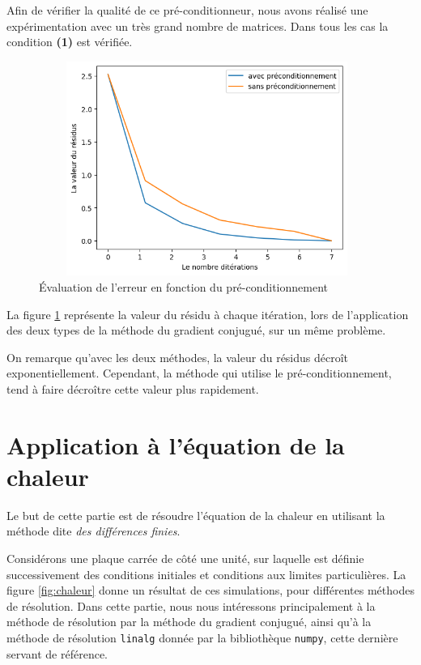 \documentclass[a4paper]{article}
\begin{document}
Afin de vérifier la qualité de ce pré-conditionneur, nous avons réalisé une expérimentation avec un très grand nombre de matrices. Dans tous les cas la condition \textbf{(1)} est vérifiée.

\begin{figure}[!h] 
  \centering
  \includegraphics[width=11cm, height= 7cm]{precond.png}
  \caption{Évaluation de l'erreur en fonction du pré-conditionnement}
  \label{fig:precond}
\end{figure}

La figure \ref{fig:precond} représente la valeur du résidu à chaque itération, lors de l'application des deux types de la méthode du gradient conjugué, sur un même problème.

On remarque qu'avec les deux méthodes, la valeur du résidus décroît exponentiellement. Cependant, la méthode qui utilise le pré-conditionnement, tend à faire décroître cette valeur plus rapidement.


\section{Application à l'équation de la chaleur}

Le but de cette partie est de résoudre l'équation de la chaleur en utilisant la méthode dite \emph{des différences finies}. 

Considérons une plaque carrée de côté une unité, sur laquelle est définie successivement des conditions initiales et conditions aux limites particulières. La figure \ref{fig:chaleur} donne un résultat de ces simulations, pour différentes méthodes de résolution. Dans cette partie, nous nous intéressons principalement à la méthode de résolution par la méthode du gradient conjugué, ainsi qu'à la méthode de résolution \texttt{linalg} donnée par la bibliothèque \texttt{numpy}, cette dernière servant de référence.
\end{document}
